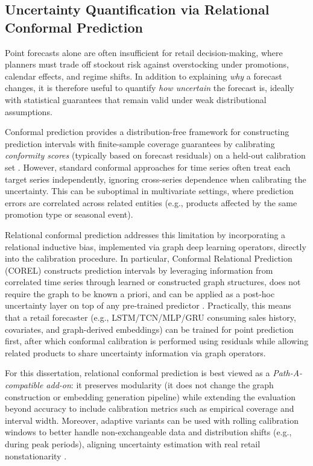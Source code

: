 \subsection{Uncertainty Quantification via Relational Conformal Prediction}
\label{ss:relational-conformal}

Point forecasts alone are often insufficient for retail decision-making, where planners must trade off stockout risk against overstocking under promotions, calendar effects, and regime shifts. In addition to explaining \emph{why} a forecast changes, it is therefore useful to quantify \emph{how uncertain} the forecast is, ideally with statistical guarantees that remain valid under weak distributional assumptions.

Conformal prediction provides a distribution-free framework for constructing prediction intervals with finite-sample coverage guarantees by calibrating \emph{conformity scores} (typically based on forecast residuals) on a held-out calibration set \cite{vovk2005algorithmic,romano2019conformalized}. However, standard conformal approaches for time series often treat each target series independently, ignoring cross-series dependence when calibrating the uncertainty. This can be suboptimal in multivariate settings, where prediction errors are correlated across related entities (e.g., products affected by the same promotion type or seasonal event).

Relational conformal prediction addresses this limitation by incorporating a relational inductive bias, implemented via graph deep learning operators, directly into the calibration procedure. In particular, Conformal Relational Prediction (COREL) constructs prediction intervals by leveraging information from correlated time series through learned or constructed graph structures, does not require the graph to be known a priori, and can be applied as a post-hoc uncertainty layer on top of any pre-trained predictor \cite{cini2025relationalconformalpredictioncorrelated}. Practically, this means that a retail forecaster (e.g., LSTM/TCN/MLP/GRU consuming sales history, covariates, and graph-derived embeddings) can be trained for point prediction first, after which conformal calibration is performed using residuals while allowing related products to share uncertainty information via graph operators.

For this dissertation, relational conformal prediction is best viewed as a \emph{Path-A-compatible add-on}: it preserves modularity (it does not change the graph construction or embedding generation pipeline) while extending the evaluation beyond accuracy to include calibration metrics such as empirical coverage and interval width. Moreover, adaptive variants can be used with rolling calibration windows to better handle non-exchangeable data and distribution shifts (e.g., during peak periods), aligning uncertainty estimation with real retail nonstationarity \cite{gibbs2021adaptiveconformalinferencedistribution}.

